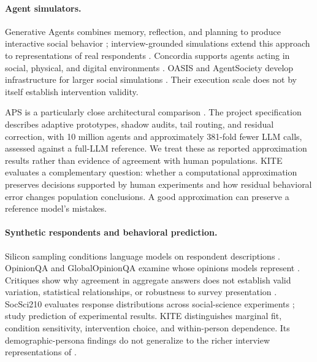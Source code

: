 \documentclass[11pt]{article}
\begin{document}
\paragraph{Agent simulators.}
Generative Agents combines memory, reflection, and planning to produce interactive social behavior \citep{park2023}; interview-grounded simulations extend this approach to representations of real respondents \citep{park2024}. Concordia supports agents acting in social, physical, and digital environments \citep{vezhnevets2023}. OASIS and AgentSociety develop infrastructure for larger social simulations \citep{yang2024,piao2025}. Their execution scale does not by itself establish intervention validity.

APS is a particularly close architectural comparison \citep{zheng2026}. The project specification describes adaptive prototypes, shadow audits, tail routing, and residual correction, with 10 million agents and approximately 381-fold fewer LLM calls, assessed against a full-LLM reference. We treat these as reported approximation results rather than evidence of agreement with human populations. KITE evaluates a complementary question: whether a computational approximation preserves decisions supported by human experiments and how residual behavioral error changes population conclusions. A good approximation can preserve a reference model's mistakes.

\paragraph{Synthetic respondents and behavioral prediction.}
Silicon sampling conditions language models on respondent descriptions \citep{argyle2023}. OpinionQA and GlobalOpinionQA examine whose opinions models represent \citep{santurkar2023,durmus2023}. Critiques show why agreement in aggregate answers does not establish valid variation, statistical relationships, or robustness to survey presentation \citep{bisbee2024,dominguez2024}. SocSci210 evaluates response distributions across social-science experiments \citep{kolluri2025}; \citet{ashokkumar2026} study prediction of experimental results. KITE distinguishes marginal fit, condition sensitivity, intervention choice, and within-person dependence. Its demographic-persona findings do not generalize to the richer interview representations of \citet{park2024}.
\end{document}
